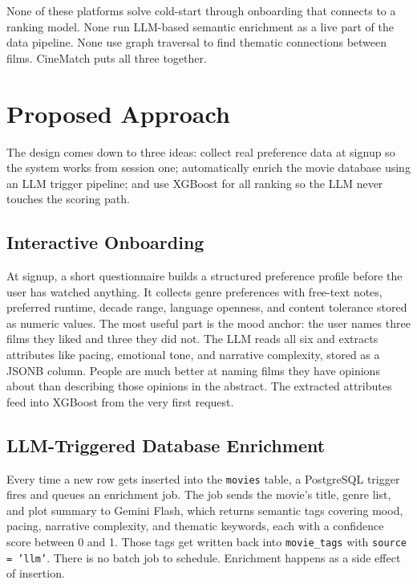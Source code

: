 \documentclass[conference]{IEEEtran}
\begin{document}
None of these platforms solve cold-start through onboarding that connects to a ranking model. None run LLM-based semantic enrichment as a live part of the data pipeline. None use graph traversal to find thematic connections between films. CineMatch puts all three together.

\section{Proposed Approach}

The design comes down to three ideas: collect real preference data at signup so the system works from session one; automatically enrich the movie database using an LLM trigger pipeline; and use XGBoost for all ranking so the LLM never touches the scoring path.

\subsection{Interactive Onboarding}

At signup, a short questionnaire builds a structured preference profile before the user has watched anything. It collects genre preferences with free-text notes, preferred runtime, decade range, language openness, and content tolerance stored as numeric values. The most useful part is the mood anchor: the user names three films they liked and three they did not. The LLM reads all six and extracts attributes like pacing, emotional tone, and narrative complexity, stored as a JSONB column. People are much better at naming films they have opinions about than describing those opinions in the abstract. The extracted attributes feed into XGBoost from the very first request.

\subsection{LLM-Triggered Database Enrichment}

Every time a new row gets inserted into the \texttt{movies} table, a PostgreSQL trigger fires and queues an enrichment job. The job sends the movie's title, genre list, and plot summary to Gemini Flash, which returns semantic tags covering mood, pacing, narrative complexity, and thematic keywords, each with a confidence score between 0 and 1. Those tags get written back into \texttt{movie\_tags} with \texttt{source = 'llm'}. There is no batch job to schedule. Enrichment happens as a side effect of insertion.
\end{document}
